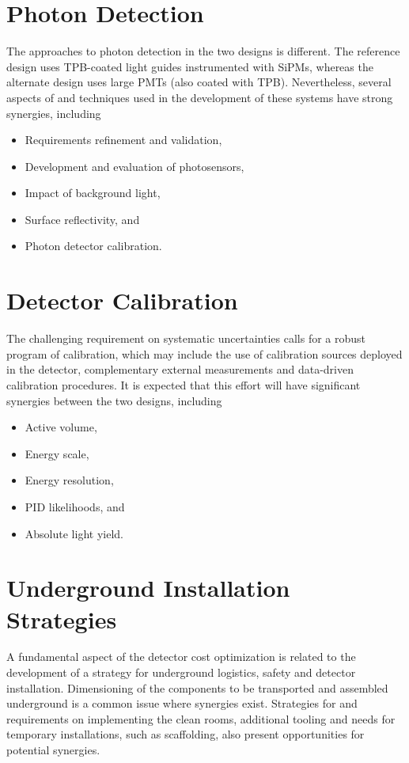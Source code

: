  
\section{Photon Detection}

The approaches to photon detection in the two designs is
different.  The reference design uses TPB-coated light guides
instrumented with SiPMs, whereas the alternate design uses large PMTs
(also coated with TPB). Nevertheless, several aspects of and
techniques used in the development of these systems have strong synergies, including
\begin{itemize}
\item Requirements refinement and validation,
\item Development and evaluation of photosensors,
\item Impact of background light,
\item  Surface reflectivity, and
\item Photon detector calibration.
\end{itemize}


\section{Detector Calibration}

The challenging requirement on systematic uncertainties calls for a
robust program of calibration, which may include the use of calibration sources
deployed in the detector, complementary external measurements
and data-driven calibration procedures. It is expected that this effort
will have significant synergies between the two designs, including
\begin{itemize}
\item Active volume,
\item Energy scale,
\item Energy resolution,
\item PID likelihoods, and
\item Absolute light yield.
\end{itemize}


\section{Underground Installation Strategies}

A fundamental aspect of the detector cost optimization is related to
the development of a strategy for underground logistics, safety and detector
installation. Dimensioning of the components to be transported and
assembled underground is a common issue where synergies
exist. Strategies for and requirements on implementing the clean
rooms, additional tooling and needs for temporary installations, such
as scaffolding, also present opportunities for potential synergies.

